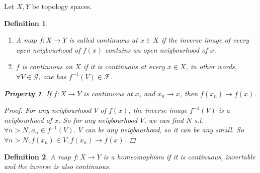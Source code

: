 \documentclass{article}
\newtheorem*{property}{Property}
\newtheorem*{definition}{Definition}
\begin{document}
Let $X, Y$ be topology spaces.
\begin{definition} \hfil
    \begin{enumerate}
        \item A map $f: X \rightarrow Y$ is called continuous at $x \in X$ if the inverse image of every
        open neigbourhood of $f(x)$ contains an open neigbourhood of $x$.
        \item $f$ is continuous on $X$ if it is continuous at every $x \in X$, in other words,
        $\forall V \in \mathcal{G}$, one has $f^{-1}(V) \in \mathcal{F}$.
    \end{enumerate}
    \begin{property}
        If $f: X \rightarrow Y$ is continuous at $x$, and $x_n \rightarrow x$, then $f(x_n) \rightarrow f(x)$.
        \begin{proof}
            For any neigbourhood $V$ of $f(x)$, the inverse image $f^{-1}(V)$ is a neigbourhood of $x$.
            So for any neigbourhood $V$, we can find $N$ s.t. $\forall n > N, x_n \in f^{-1}(V)$.
            $V$ can be any neigbourhood, so it can be any small.
            So $\forall n > N, f(x_n) \in V, f(x_n) \rightarrow f(x)$.
        \end{proof}
    \end{property}
\end{definition}
\begin{definition}
    A map $f: X \rightarrow Y$ is a homeomophism if it is continuous, invertable and the inverse is also continuous.
\end{definition}
\end{document}
